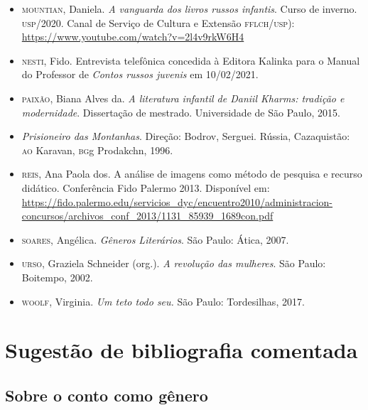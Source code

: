 \documentclass[11pt]{extarticle}
\begin{document}
\begin{itemize}
\item[]\textsc{mountian}, Daniela. \emph{A vanguarda dos livros russos infantis}. Curso
de inverno. \textsc{usp}/2020. Canal de Serviço de Cultura e Extensão \textsc{fflch}/\textsc{usp}):
\url{https://www.youtube.com/watch?v=2l4v9rkW6H4}

\item[]\textsc{nesti}, Fido. Entrevista telefônica concedida à Editora Kalinka para o
Manual do Professor de \emph{Contos russos juvenis} em
10/02/2021.

\item[]\textsc{paixão}, Biana Alves da. \emph{A literatura infantil de Daniil Kharms:
tradição e modernidade}. Dissertação de mestrado. Universidade de São
Paulo, 2015.

\item[]\emph{Prisioneiro das Montanhas}. Direção: Bodrov, Serguei. Rússia,
Cazaquistão: \textsc{ao} Karavan, \textsc{bg}g Prodakchn, 1996.

\item[]\textsc{reis}, Ana Paola dos. A análise de imagens como método de pesquisa e
recurso didático. Conferência Fido Palermo 2013.
Disponível em:
\url{https://fido.palermo.edu/servicios_dyc/encuentro2010/administracion-concursos/archivos_conf_2013/1131_85939_1689con.pdf}

\item[]\textsc{soares}, Angélica. \emph{Gêneros Literários}. São Paulo: Ática, 2007.

\item[]\textsc{urso}, Graziela Schneider (org.). \emph{A revolução das mulheres}. São
Paulo: Boitempo, 2002.

\item[]\textsc{woolf}, Virginia. \emph{Um teto todo seu.} São Paulo: Tordesilhas, 2017.
\end{itemize}

\section{Sugestão de bibliografia comentada}

\subsection{Sobre o conto como gênero}
\end{document}
